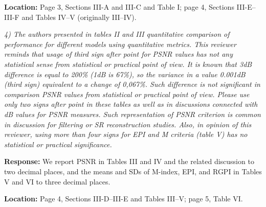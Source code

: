 \documentclass[11pt,letterpaper]{article}
\begin{document}
\textbf{Location:} Page 3, Sections III-A and III-C and Table I; page 4, Sections III-E--III-F and Tables IV--V (originally III--IV).

\textit{4) The authors presented in tables II and III quantitative comparison of performance for different models using quantitative metrics. This reviewer reminds that usage of third sign after point for PSNR values has not any statistical sense from statistical or practical point of view. It is known that 3dB difference is equal to 200\% (1dB is 67\%), so the variance in a value 0.001dB (third sign) equivalent to a change of 0,067\%. Such difference is not significant in comparison PSNR values from statistical or practical point of view. Please use only two signs after point in these tables as well as in discussions connected with dB values for PSNR measures. Such representation of PSNR criterion is common in discussion for filtering or SR reconstruction studies. Also, in opinion of this reviewer, using more than four signs for EPI and M criteria (table V) has no statistical or practical significance.}

\medskip
\textbf{Response:} We report PSNR in Tables III and IV and the related discussion to two decimal places, and the means and SDs of M-index, EPI, and RGPI in Tables V and VI to three decimal places.

\textbf{Location:} Page 4, Sections III-D--III-E and Tables III--V; page 5, Table VI.
\end{document}
